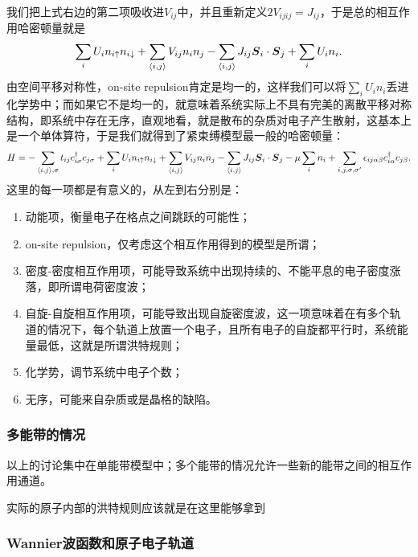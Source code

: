 我们把上式右边的第二项吸收进$V_{ij}$中，并且重新定义$2V_{ijij}=J_{ij}$，于是总的相互作用哈密顿量就是
\[
    \sum_{i} U_i n_{i \uparrow} n_{i \downarrow} + \sum_{\langle i, j \rangle} V_{ij} n_i n_j - \sum_{\langle i, j \rangle} J_{i j} \vb*{S}_{i} \cdot \vb*{S}_j + \sum_{i} U_i n_i.
\]
由空间平移对称性，on-site repulsion肯定是均一的，这样我们可以将$\sum_i U_i n_i$丢进化学势中；而如果它不是均一的，就意味着系统实际上不具有完美的离散平移对称结构，即系统中存在无序，直观地看，就是散布的杂质对电子产生散射，这基本上是一个单体算符，于是我们就得到了紧束缚模型最一般的哈密顿量：
\begin{equation}
    H = - \sum_{\langle i, j \rangle, \sigma} t_{ij} c^\dagger_{i \sigma} c_{j \sigma} 
    + \sum_{i} U_i n_{i \uparrow} n_{i \downarrow} 
    + \sum_{\langle i, j \rangle} V_{ij} n_i n_j - \sum_{\langle i, j \rangle} J_{i j} \vb*{S}_{i} \cdot \vb*{S}_j 
    - \mu \sum_i n_i + \sum_{i, j, \sigma, \sigma'} \epsilon_{ij\alpha \beta} c^\dagger_{i \alpha} c_{j \beta}.  
\end{equation}
这里的每一项都是有意义的，从左到右分别是：
\begin{enumerate}
    \item 动能项，衡量电子在格点之间跳跃的可能性；
    \item on-site repulsion，仅考虑这个相互作用得到的模型是所谓；
    \item 密度-密度相互作用项，可能导致系统中出现持续的、不能平息的电子密度涨落，即所谓电荷密度波；
    \item 自旋-自旋相互作用项，可能导致出现自旋密度波，这一项意味着在有多个轨道的情况下，每个轨道上放置一个电子，且所有电子的自旋都平行时，系统能量最低，这就是所谓洪特规则；
    \item 化学势，调节系统中电子个数；
    \item 无序，可能来自杂质或是晶格的缺陷。
\end{enumerate}

\subsubsection{多能带的情况}

以上的讨论集中在单能带模型中；多个能带的情况允许一些新的能带之间的相互作用通道。

实际的原子内部的洪特规则应该就是在这里能够拿到

\subsubsection{Wannier波函数和原子电子轨道}

